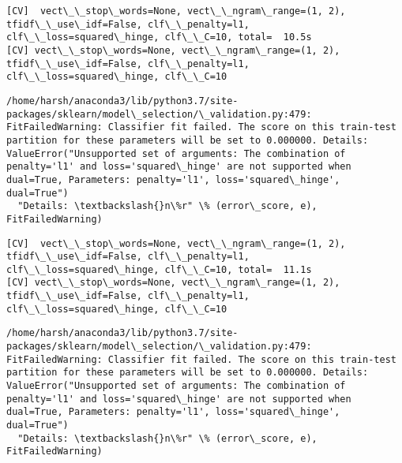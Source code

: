 \documentclass[11pt]{article}
\begin{document}
    \begin{Verbatim}[commandchars=\\\{\}]
[CV]  vect\_\_stop\_words=None, vect\_\_ngram\_range=(1, 2), tfidf\_\_use\_idf=False, clf\_\_penalty=l1, clf\_\_loss=squared\_hinge, clf\_\_C=10, total=  10.5s
[CV] vect\_\_stop\_words=None, vect\_\_ngram\_range=(1, 2), tfidf\_\_use\_idf=False, clf\_\_penalty=l1, clf\_\_loss=squared\_hinge, clf\_\_C=10 

    \end{Verbatim}

    \begin{Verbatim}[commandchars=\\\{\}]
/home/harsh/anaconda3/lib/python3.7/site-packages/sklearn/model\_selection/\_validation.py:479: FitFailedWarning: Classifier fit failed. The score on this train-test partition for these parameters will be set to 0.000000. Details: 
ValueError("Unsupported set of arguments: The combination of penalty='l1' and loss='squared\_hinge' are not supported when dual=True, Parameters: penalty='l1', loss='squared\_hinge', dual=True")
  "Details: \textbackslash{}n\%r" \% (error\_score, e), FitFailedWarning)

    \end{Verbatim}

    \begin{Verbatim}[commandchars=\\\{\}]
[CV]  vect\_\_stop\_words=None, vect\_\_ngram\_range=(1, 2), tfidf\_\_use\_idf=False, clf\_\_penalty=l1, clf\_\_loss=squared\_hinge, clf\_\_C=10, total=  11.1s
[CV] vect\_\_stop\_words=None, vect\_\_ngram\_range=(1, 2), tfidf\_\_use\_idf=False, clf\_\_penalty=l1, clf\_\_loss=squared\_hinge, clf\_\_C=10 

    \end{Verbatim}

    \begin{Verbatim}[commandchars=\\\{\}]
/home/harsh/anaconda3/lib/python3.7/site-packages/sklearn/model\_selection/\_validation.py:479: FitFailedWarning: Classifier fit failed. The score on this train-test partition for these parameters will be set to 0.000000. Details: 
ValueError("Unsupported set of arguments: The combination of penalty='l1' and loss='squared\_hinge' are not supported when dual=True, Parameters: penalty='l1', loss='squared\_hinge', dual=True")
  "Details: \textbackslash{}n\%r" \% (error\_score, e), FitFailedWarning)

    \end{Verbatim}
\end{document}
